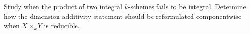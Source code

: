 \begin{problem}\label{chall:vi30-04}
Study when the product of two integral $k$-schemes fails to be integral. Determine how the dimension-additivity statement should be reformulated componentwise when $X\times_kY$ is reducible.
\end{problem}
